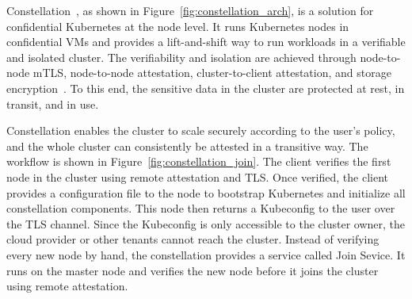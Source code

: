 Constellation~\cite*{Constellation}, as shown in Figure~\ref{fig:constellation_arch}, is a solution for confidential Kubernetes at the node level. It runs Kubernetes nodes in confidential VMs and provides a lift-and-shift way to run workloads in a verifiable and isolated cluster. The verifiability and isolation are achieved through node-to-node mTLS, 
node-to-node attestation, cluster-to-client attestation, and storage encryption~\cite*{Constellation_Encrypted_Kubernetes}. To this end, the sensitive data in the cluster are protected at rest, in transit, and in use. 
 


Constellation enables the cluster to scale securely according to the user's policy, and the whole cluster can consistently be attested in a transitive way. The workflow is shown in Figure~\ref{fig:constellation_join}. The client verifies the first node in the cluster using remote attestation and TLS. 
Once verified, the client provides a configuration file to the node to bootstrap Kubernetes and initialize all constellation components. This node then returns a Kubeconfig to the user over the TLS channel. Since the Kubeconfig is only accessible to the cluster owner, the cloud provider or other tenants 
cannot reach the cluster. Instead of verifying every new node by hand, the constellation provides a service called Join Sevice. It runs on the master node and verifies the new node before it joins the cluster using remote attestation.
